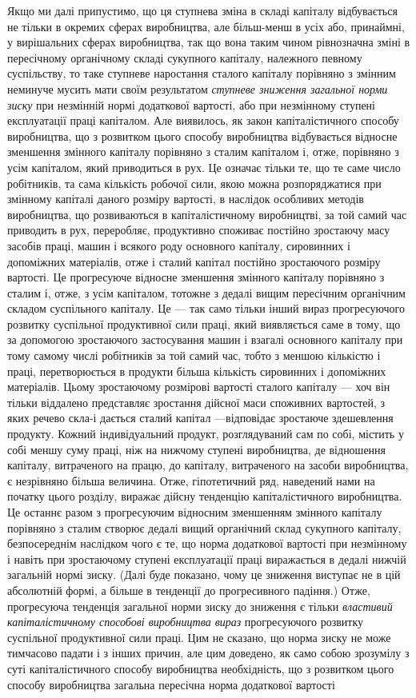 \documentclass[12pt, a4paper, final]{memoir}
\begin{document}
Якщо ми далі припустимо, що ця ступнева зміна в складі капіталу відбувається не тільки в окремих сферах виробництва, але більш-менш в усіх або, принаймні, у вирішальних сферах виробництва, так що вона таким чином рівнозначна зміні в пересічному органічному складі сукупного капіталу, належного певному суспільству, то таке ступневе наростання сталого капіталу порівняно з змінним неминуче мусить мати своїм результатом \emph{ступневе зниження загальної норми зиску} при незмінній нормі додаткової вартості, або при незмінному ступені експлуатації праці капіталом. Але виявилось, як закон капіталістичного способу виробництва, що з розвитком цього способу виробництва відбувається відносне зменшення змінного капіталу порівняно з сталим капіталом і, отже, порівняно з усім капіталом, який приводиться в рух. Це означає тільки те, що те саме число робітників, та сама кількість робочої сили, якою можна розпоряджатися при змінному капіталі даного розміру вартості, в наслідок особливих методів виробництва, що розвиваються в капіталістичному виробництві, за той самий час приводить в рух, переробляє, продуктивно споживає постійно зростаючу масу засобів праці, машин і всякого роду основного капіталу, сировинних і допоміжних матеріалів, отже і сталий капітал постійно зростаючого розміру вартості. Це прогресуюче відносне зменшення змінного капіталу порівняно з сталим і, отже, з усім капіталом, тотожне з дедалі вищим пересічним органічним складом суспільного капіталу. Це — так само тільки інший вираз прогресуючого розвитку суспільної продуктивної сили праці, який виявляється саме в тому, що за допомогою зростаючого застосування машин і взагалі основного капіталу при тому самому числі робітників за той самий час, тобто з меншою кількістю і праці, перетворюється в продукти більша кількість сировинних і допоміжних матеріалів. Цьому зростаючому розмірові вартості сталого капіталу — хоч він тільки віддалено представляє зростання дійсної маси споживних вартостей, з яких речево скла-і дається сталий капітал —відповідає зростаюче здешевлення продукту. Кожний індивідуальний продукт, розглядуваний сам по собі, містить у собі меншу суму праці, ніж на нижчому ступені виробництва, де відношення капіталу, витраченого на працю, до капіталу, витраченого на засоби виробництва, є незрівняно більша величина. Отже, гіпотетичний ряд, наведений нами на початку цього розділу, виражає дійсну тенденцію капіталістичного виробництва. Це останнє разом з прогресуючим відносним зменшенням змінного капіталу порівняно з сталим створює дедалі вищий органічний склад сукупного капіталу, безпосереднім наслідком чого є те, що норма додаткової вартості при незмінному і навіть при зростаючому ступені експлуатації праці виражається в дедалі нижчій загальній нормі зиску. (Далі буде показано, чому це зниження виступає не в цій абсолютній формі, а більше в тенденції до прогресивного падіння.) Отже, прогресуюча тенденція загальної норми зиску до зниження є тільки \emph{властивий капіталістичному способові виробництва вираз} прогресуючого розвитку суспільної продуктивної сили праці. Цим не сказано, що норма зиску не може тимчасово падати і з інших причин, але цим доведено, як само собою зрозумілу з суті капіталістичного способу виробництва необхідність, що з розвитком цього способу виробництва загальна пересічна норма додаткової вартості 
\end{document}
